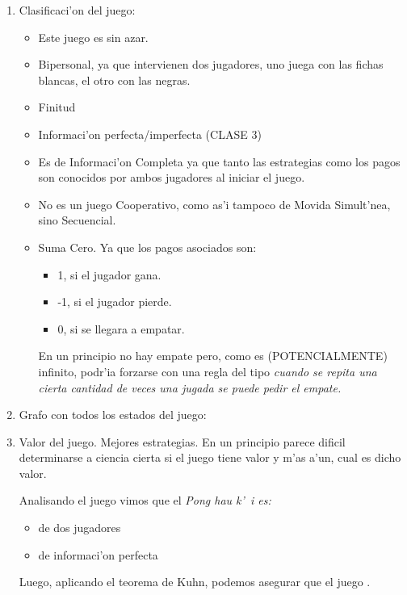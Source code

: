 \begin{enumerate}
\item Clasificaci'on del juego:

\begin{itemize}
\item Este juego es sin azar.

\item Bipersonal, ya que intervienen dos jugadores, uno juega con las fichas blancas, el otro con las negras.

\item Finitud

\item Informaci'on perfecta/imperfecta  (CLASE 3)

\item Es de Informaci'on Completa ya que tanto las estrategias como los pagos son conocidos por ambos jugadores al iniciar el juego.

\item No es un juego Cooperativo, como as'i tampoco de Movida Simult'nea, sino Secuencial.

\item Suma Cero. Ya que los pagos asociados son:
\begin{itemize}
\item 1, si el jugador gana.
\item -1, si el jugador pierde.
\item 0, si se llegara a empatar.
\end{itemize}
En un principio no hay empate pero, como es (POTENCIALMENTE) infinito, podr'ia forzarse con una regla del tipo \it{cuando se repita una cierta cantidad de veces una jugada se puede pedir el empate}.
\end{itemize}

\item Grafo con todos los estados del juego:

\item Valor del juego. Mejores estrategias.
En un principio parece dificil determinarse a ciencia cierta si el juego tiene valor y m'as a'un, cual es dicho valor.

Analisando el juego vimos que el \it{Pong hau k'\ i} es:

\begin{itemize}
\item de dos jugadores
\item de informaci'on perfecta
\end{itemize}

Luego, aplicando el teorema de Kuhn, podemos asegurar que el juego .






\end{enumerate}
